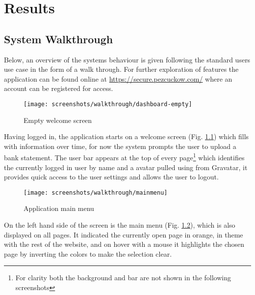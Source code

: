 \begin{comment}
Chapter 5: Results
Results that illustrate how the system designed by you works in practice, and how it is intended to be used, may be presented in this chapter. Screen shots may be useful to illustrate how the software interacts with the user.
\end{comment}

\chapter[Results]{Results}

\section{System Walkthrough}
Below, an overview of the systems behaviour is given following the standard users use case in the form of a walk through. For further exploration of features the application can be found online at \url{https://secure.pezcuckow.com/} where an account can be registered for access.

\begin{figure}
\centering
\texttt{[image: screenshots/walkthrough/dashboard-empty]}
\caption{Empty welcome screen}
\label{fig:welcomescreen}
\end{figure}

Having logged in, the application starts on a welcome screen (Fig. \ref{fig:welcomescreen}) which fills with information over time, for now the system prompts the user to upload a bank statement. The user bar appears at the top of every page\footnote{For clarity both the background and bar are not shown in the following screenshots} which identifies the currently logged in user by name and a avatar pulled using from Gravatar\parencite{gravatar2014avatars}, it provides quick access to the user settings and allows the user to logout.

\begin{figure}
\centering
\texttt{[image: screenshots/walkthrough/mainmenu]}
\caption{Application main menu}
\label{fig:mainmenu}
\end{figure}

On the left hand side of the screen is the main menu (Fig. \ref{fig:mainmenu}), which is also displayed on all pages. It indicated the currently open page in orange, in theme with the rest of the website, and on hover with a mouse it highlights the chosen page by inverting the colors to make the selection clear.

